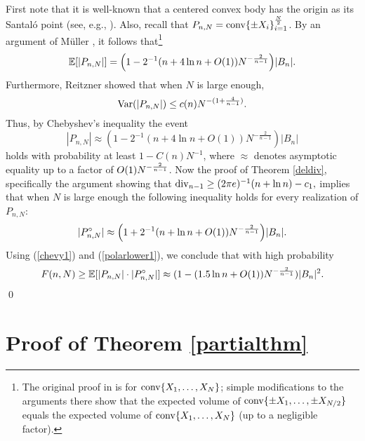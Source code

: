 First note that it is well-known that a centered convex body has the origin as its Santal\'o point (see, e.g., \cite{SchneiderBook}). Also, recall that $ P_{n,N} = \operatorname{conv}\{\pm X_i\}_{i=1}^{\frac{N}{2}}$. By an argument of M\"uller \cite{muller1990approximation}, it follows  that\footnote{The original proof in \cite{muller1990approximation} is for $\operatorname{conv}\{X_1,\ldots,X_{N}\}$; simple modifications to the arguments there show that the expected volume of $\operatorname{conv}\{\pm X_1,\ldots,\pm X_{N/2}\}$ equals the expected volume of $\operatorname{conv}\{ X_1,\ldots,X_{N}\}$ (up to a negligible factor).}
\[
\E[|P_{n,N}|] = \left(1-2^{-1}\left(n+4\ln n+O(1)\right)N^{-\frac{2}{n-1}}\right)|B_n|.
\]
Furthermore, Reitzner \cite{reitzner2003random} showed that when $ N $  is large enough,%
\[
\operatorname{Var}(|P_{n,N}|) \leq c(n)N^{-(1+\frac{4}{n-1})}.
\]
Thus, by Chebyshev's inequality the event
\begin{equation}\label{chevy1}
|P_{n,N}| \approx \left(1-2^{-1}(n+ 4\ln n+O(1))N^{-\frac{2}{n-1}}\right)|B_n|  
\end{equation}
holds with probability at least $1-C(n)N^{-1}$, where $\approx$ denotes asymptotic equality up to a factor of $O(1)N^{-\frac 2{n-1}}$. Now the proof of Theorem \ref{deldiv}, specifically the argument showing that $\operatorname{div}_{n-1} \geq (2\pi e)^{-1}(n+\ln n) - c_1,$ implies that when $ N$ is large enough the following inequality holds for every realization of $ P_{n,N}$: 
\begin{equation}\label{polarlower1}
|P^{\circ}_{n,N}| \approx \left(1+2^{-1}(n+\ln n+O(1))\NN\right)|B_n| .
\end{equation}
Using (\ref{chevy1}) and (\ref{polarlower1}), we conclude that with high probability
\[
F(n,N) \geq {\mathbb{E}}[|P_{n,N}|\cdot|P^{\circ}_{n,N}|] \approx (1-(1.5\ln n + O(1))N^{-\frac 2{n-1}})|B_n|^2.
\]
\qed

\section{Proof of Theorem  \ref{partialthm}}\label{spherethm} %

